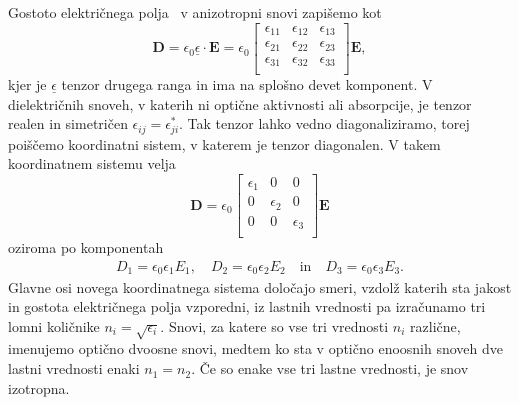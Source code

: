 Gostoto električnega polja~ v anizotropni snovi zapišemo kot 
\begin{equation}
\mathbf{D}=\epsilon_{0}\underline{\epsilon} \cdot\mathbf{E} = 
\epsilon_{0}
\left[\begin{array}{ccc}
\epsilon_{11} & \epsilon_{12}& \epsilon_{13}\\
\epsilon_{21} & \epsilon_{22}& \epsilon_{23}\\
\epsilon_{31} & \epsilon_{32}& \epsilon_{33}\\
\end{array}\right]\mathbf{E},
\label{eq:gostota-elektricnega-polja-tenzor}
\end{equation}
kjer je $\underline{\epsilon}$ tenzor drugega ranga in ima na splošno devet komponent.
V dielektričnih snoveh, v katerih ni optične aktivnosti ali absorpcije, je tenzor
realen in simetričen $\epsilon_{ij}=\epsilon_{ji}^*$. Tak tenzor lahko vedno
diagonaliziramo, torej poiščemo koordinatni sistem, v katerem je tenzor
diagonalen. V takem koordinatnem sistemu velja 
\begin{equation}
\mathbf{D} = \epsilon_{0}
\left[\begin{array}{ccc}
\epsilon_{1} & 0& 0\\
0 & \epsilon_{2}& 0\\
0 & 0& \epsilon_{3}\\
\end{array}\right]\mathbf{E}
\end{equation}
oziroma po komponentah
\begin{align}
D_{1}=\epsilon_{0}\epsilon_{1}E_{1}, \quad
D_{2}=\epsilon_{0}\epsilon_{2}E_{2} \quad \mathrm{in} \quad
 D_{3}=\epsilon_{0}\epsilon_{3}E_{3}.\label{eq:gostota-elektricnega-polja-lastni}
\end{align}
Glavne osi novega koordinatnega sistema določajo smeri, vzdolž katerih sta jakost
in gostota električnega polja vzporedni, iz lastnih vrednosti 
pa izračunamo tri lomni količnike $n_{i}=\sqrt{\epsilon_{i}}$. Snovi,
za katere so vse tri vrednosti $n_i$ različne, imenujemo optično dvoosne snovi, 
medtem ko sta v optično enoosnih snoveh dve lastni vrednosti enaki $n_{1}=n_{2}$. 
Če so enake vse tri lastne vrednosti, je snov izotropna.

